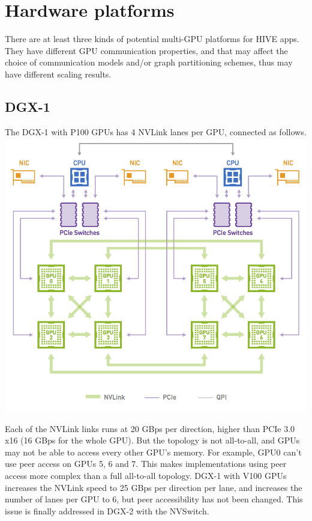 \documentclass[10pt,oneside]{memoir}
\begin{document}
\hypertarget{hardware-platforms}{%
\section{Hardware platforms}\label{hardware-platforms}}

There are at least three kinds of potential multi-GPU platforms for HIVE
apps. They have different GPU communication properties, and that may
affect the choice of communication models and/or graph partitioning
schemes, thus may have different scaling results.

\hypertarget{dgx-1}{%
\subsection{DGX-1}\label{dgx-1}}

The DGX-1 with P100 GPUs has 4 NVLink lanes per GPU, connected as
follows. \includegraphics{attachments/scaling/NVLink-DGX1.png}

Each of the NVLink links runs at 20 GBps per direction, higher than PCIe
3.0 x16 (16 GBps for the whole GPU). But the topology is not all-to-all,
and GPUs may not be able to access every other GPU's memory. For
example, GPU0 can't use peer access on GPUs 5, 6 and 7. This makes
implementations using peer access more complex than a full all-to-all
topology. DGX-1 with V100 GPUs increases the NVLink speed to 25 GBps per
direction per lane, and increases the number of lanes per GPU to 6, but
peer accessibility has not been changed. This issue is finally addressed
in DGX-2 with the NVSwitch.
\end{document}
